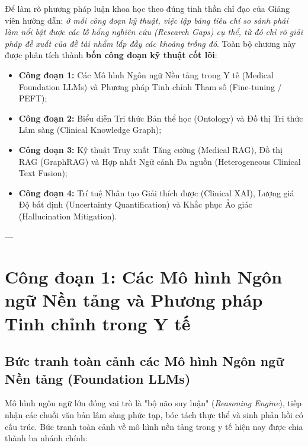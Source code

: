 Để làm rõ phương pháp luận khoa học theo đúng tinh thần chỉ đạo của Giảng viên hướng dẫn: \emph{ở mỗi công đoạn kỹ thuật, việc lập bảng tiêu chí so sánh phải làm nổi bật được các lỗ hổng nghiên cứu (Research Gaps) cụ thể, từ đó chỉ rõ giải pháp đề xuất của đề tài nhằm lấp đầy các khoảng trống đó}. Toàn bộ chương này được phân tích thành \textbf{bốn công đoạn kỹ thuật cốt lõi}:
\begin{itemize}
    \item \textbf{Công đoạn 1:} Các Mô hình Ngôn ngữ Nền tảng trong Y tế (Medical Foundation LLMs) và Phương pháp Tinh chỉnh Tham số (Fine-tuning / PEFT);
    \item \textbf{Công đoạn 2:} Biểu diễn Tri thức Bản thể học (Ontology) và Đồ thị Tri thức Lâm sàng (Clinical Knowledge Graph);
    \item \textbf{Công đoạn 3:} Kỹ thuật Truy xuất Tăng cường (Medical RAG), Đồ thị RAG (GraphRAG) và Hợp nhất Ngữ cảnh Đa nguồn (Heterogeneous Clinical Text Fusion);
    \item \textbf{Công đoạn 4:} Trí tuệ Nhân tạo Giải thích được (Clinical XAI), Lượng giá Độ bất định (Uncertainty Quantification) và Khắc phục Ảo giác (Hallucination Mitigation).
\end{itemize}

---

\section{Công đoạn 1: Các Mô hình Ngôn ngữ Nền tảng và Phương pháp Tinh chỉnh trong Y tế}

\subsection{Bức tranh toàn cảnh các Mô hình Ngôn ngữ Nền tảng (Foundation LLMs)}
Mô hình ngôn ngữ lớn đóng vai trò là "bộ não suy luận" (\emph{Reasoning Engine}), tiếp nhận các chuỗi văn bản lâm sàng phức tạp, bóc tách thực thể và sinh phản hồi có cấu trúc. Bức tranh toàn cảnh về mô hình nền tảng trong y tế hiện nay được chia thành ba nhánh chính:

